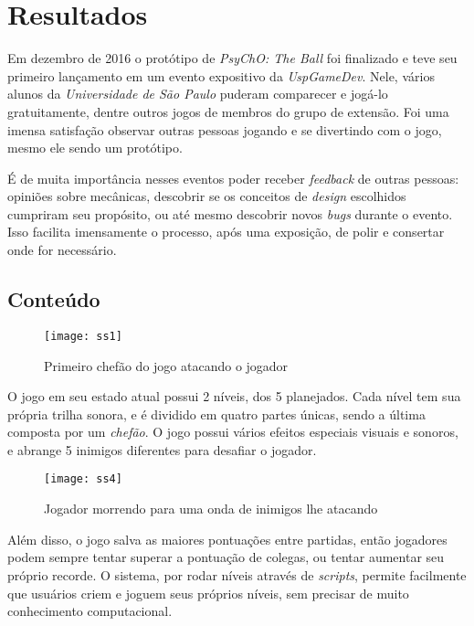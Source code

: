 \chapter{Resultados}
\label{cap:resultados}

Em dezembro de 2016 o protótipo de \textit{PsyChO: The Ball} foi finalizado e teve seu primeiro lançamento em um evento expositivo da \textit{UspGameDev}. Nele, vários alunos da \textit{Universidade de São Paulo} puderam comparecer e jogá-lo gratuitamente, dentre outros jogos de membros do grupo de extensão. Foi uma imensa satisfação observar outras pessoas jogando e se divertindo com o jogo, mesmo ele sendo um protótipo.

É de muita importância nesses eventos poder receber \textit{feedback} de outras pessoas: opiniões sobre mecânicas, descobrir se os conceitos de \textit{design} escolhidos cumpriram seu propósito, ou até mesmo descobrir novos \textit{bugs} durante o evento. Isso facilita imensamente o processo, após uma exposição, de polir e consertar onde for necessário.

\section{Conteúdo}
\label{sec:conteudo}

\begin{figure}[h!]
\texttt{[image: ss1]}
\centering
\caption{Primeiro chefão do jogo atacando o jogador}
\end{figure}

O jogo em seu estado atual possui 2 níveis, dos 5 planejados. Cada nível tem sua própria trilha sonora, e é dividido em quatro partes únicas, sendo a última composta por um \textit{chefão}. O jogo possui vários efeitos especiais visuais e sonoros, e abrange 5 inimigos diferentes para desafiar o jogador.

\begin{figure}[h!]
\texttt{[image: ss4]}
\centering
\caption{Jogador morrendo para uma onda de inimigos lhe atacando}
\end{figure}

Além disso, o jogo salva as maiores pontuações entre partidas, então jogadores podem sempre tentar superar a pontuação de colegas, ou tentar aumentar seu próprio recorde. O sistema, por rodar níveis através de \textit{scripts}, permite facilmente que usuários criem e joguem seus próprios níveis, sem precisar de muito conhecimento computacional.

